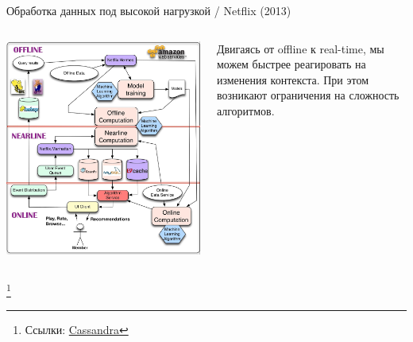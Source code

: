 \documentclass[11pt,aspectratio=169]{beamer}
\begin{document}
\begin{frame}{Обработка данных под высокой нагрузкой / Netflix (2013) \cite{NFLX}}

\begin{columns}
\begin{column}{0.6\textwidth}
   \begin{center}
		\includegraphics[scale=0.1]{images/netflix.png}
   \end{center}
\end{column}
\begin{column}{0.35\textwidth}
    \begin{small}
    \begin{tcolorbox}[colback=info!5,colframe=info!80,title=]
    Двигаясь от offline к real-time, мы можем быстрее реагировать на изменения контекста. При этом возникают ограничения на сложность алгоритмов.
    \end{tcolorbox}
    \end{small}
\end{column}
\end{columns}

\footnote{Ссылки:
\href{https://cassandra.apache.org/_/index.html}{Cassandra}
}


\end{frame}
\end{document}
